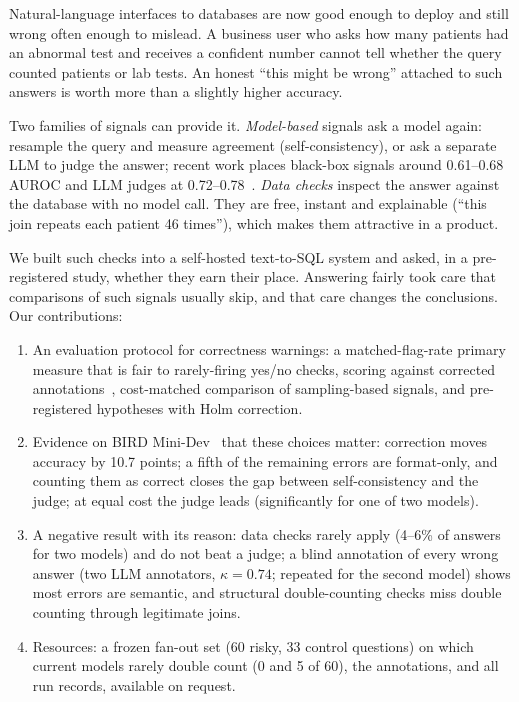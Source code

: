 \documentclass[conference]{IEEEtran}
\begin{document}
Natural-language interfaces to databases are now good enough to deploy and still wrong often enough
to mislead. A business user who asks how many patients had an abnormal test and receives a confident
number cannot tell whether the query counted patients or lab tests. An honest ``this might be wrong''
attached to such answers is worth more than a slightly higher accuracy.

Two families of signals can provide it. \emph{Model-based} signals ask a model again: resample the
query and measure agreement (self-consistency), or ask a separate LLM to judge the answer; recent work
places black-box signals around 0.61--0.68 AUROC and LLM judges at 0.72--0.78~\cite{richardson2026predicts}. \emph{Data checks} inspect the answer against the database with no
model call. They are free, instant and explainable (``this join repeats each patient 46 times''),
which makes them attractive in a product.

We built such checks into a self-hosted text-to-SQL system and asked, in a pre-registered study,
whether they earn their place. Answering fairly took care that comparisons of such signals usually
skip, and that care changes the conclusions. Our contributions:
\begin{enumerate}
\item An evaluation protocol for correctness warnings: a matched-flag-rate primary measure that is fair
to rarely-firing yes/no checks, scoring against corrected annotations~\cite{jin2026annotation},
cost-matched comparison of sampling-based signals, and pre-registered hypotheses with Holm correction.
\item Evidence on BIRD Mini-Dev~\cite{li2023bird} that these choices matter: correction moves accuracy
by 10.7 points; a fifth of the remaining errors are format-only, and counting them as correct closes
the gap between self-consistency and the judge; at equal cost the judge leads (significantly for one
of two models).
\item A negative result with its reason: data checks rarely apply (4--6\% of answers for two models) and
do not beat a judge; a blind annotation of every wrong answer (two LLM annotators, $\kappa=0.74$;
repeated for the second model) shows most errors are semantic, and structural double-counting checks miss
double counting through legitimate joins.
\item Resources: a frozen fan-out set (60 risky, 33 control questions) on which current models
rarely double count (0 and 5 of 60), the annotations, and all run records, available on request.
\end{enumerate}
\end{document}
